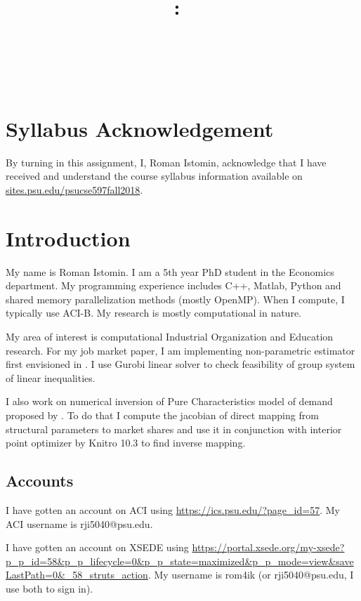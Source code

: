 \documentclass{article}
\title{\vspace{2in}\textmd{\textbf{\hmwkClass:\ \hmwkTitle}}\\\normalsize\vspace{0.1in}\small{\hmwkDueDate}\\\vspace{0.1in}\large{\textit{\hmwkClassInstructor\ \hmwkClassTime}}\vspace{3in}}
\date{}
\author{\textbf{\hmwkAuthorNameb} } %
\newcommand{\hmwkAuthorNameb}{Roman Istomin}
\begin{document}
\begin{spacing}{1.1}
\maketitle

\newpage
\section{Syllabus Acknowledgement}

By turning in this assignment, I, \hmwkAuthorNameb, acknowledge that I have received and understand the course syllabus information available on \url{sites.psu.edu/psucse597fall2018}. 

\section{Introduction}

My name is \hmwkAuthorNameb.  I am a 5th year PhD student in the Economics department. My programming experience includes C++, Matlab, Python and shared memory parallelization methods (mostly OpenMP).  When I compute, I typically use ACI-B.  My research is mostly computational in nature. 

My area of interest is computational Industrial Organization and Education research. For my job market paper, I am implementing non-parametric estimator first envisioned in \cite{agarwal2018demand}. I use Gurobi linear solver to check feasibility of group system of linear inequalities. 

I also work on numerical inversion of Pure Characteristics model of demand proposed by \cite{berry2007pure}. To do that I compute the jacobian of direct mapping from structural parameters to market shares and use it in conjunction with interior point optimizer by Knitro 10.3 to find inverse mapping. 


\subsection{Accounts}

I have gotten an account on ACI using \url{https://ics.psu.edu/?page_id=57}.  My ACI username is rji5040@psu.edu.

I have gotten an account on XSEDE using \url{https://portal.xsede.org/my-xsede?p_p_id=58&p_p_lifecycle=0&p_p_state=maximized&p_p_mode=view&saveLastPath=0&_58_struts_action}.  My username is rom4ik (or rji5040@psu.edu, I use both to sign in).


\end{spacing}
\end{document}
